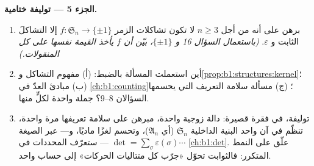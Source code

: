 \begin{problem}
\medskip
\noindent\textbf{الجزء 5 --- توليفة ختامية.}
\begin{enumerate}[resume]
  \item برهن على أنه من أجل $n \geq 3$ لا تكون تشاكلات الزمر $f
        \colon \mathfrak S_n \to \{\pm 1\}$ إلا التشاكلَ
        الثابت و $\varepsilon$. \emph{(باستعمال السؤال 16 و
         $\{\pm1\}$، بيّن أن $f$ يأخذ القيمة نفسها
        على كل المنقولات.)}
  \item أين استعملت المسألة بالضبط: (أ) مفهوم التشاكل
        و\cref{prop:b1:structures:kernel}؛ (ب) مبادئ
        العدّ في \cref{ch:b1:counting}؛ (ج) مسألة سلامة
        التعريف التي يحسمها السؤالان 8--9؟ جملة
        واحدة لكلٍّ منها.
  \item توليفة، في فقرة قصيرة: دالة زوجية واحدة،
        مبرهن على سلامة تعريفها مرة واحدة، تنظّم في آن واحد
        البنية الداخلية  $\mathfrak S_n$ (أي 
        $\mathfrak A_n$)، وتحسم لغزًا ماديًا، و---
        عبر الصيغة $\det = \sum_\sigma
        \varepsilon(\sigma)\cdots$ --- ستعرّف المحددات
        في \cref{ch:b1:det}. علّق على النمط المتكرر:
        فالثوابت تحوّل «جرّب كل متتاليات الحركات» إلى حساب
        واحد.
\end{enumerate}
\end{problem}
